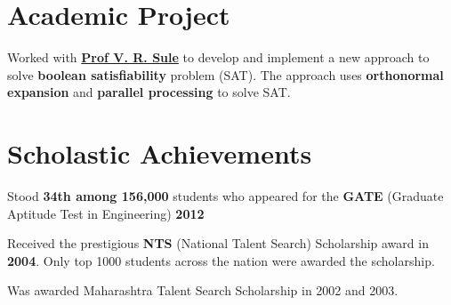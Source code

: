 \documentclass[12pt, a4paper]{deedy-resume}
\begin{document}
\begin{minipage}[t]{0.68\textwidth}
\sectionspace %

\section{Academic Project}
\vspace{\topsep}
Worked with \textbf{\href{https://www.ee.iitb.ac.in/web/faculty/homepage/vrs}{Prof V. R. Sule}} to develop and implement a new approach to solve \textbf{boolean satisfiability} problem (SAT). The approach uses \textbf{orthonormal expansion} and \textbf{parallel processing} to solve SAT.

\sectionspace %




\section{Scholastic Achievements} 
\vspace{\topsep}
\begin{tightitemize}
\item Stood \textbf{34th among 156,000} students who appeared for the \textbf{GATE} (Graduate Aptitude Test in Engineering) \textbf{2012}
\item Received the prestigious \textbf{NTS} (National Talent Search) Scholarship award in \textbf{2004}. Only top 1000 students across the nation were awarded the scholarship.
\item Was awarded Maharashtra Talent Search Scholarship in 2002 and 2003.
\end{tightitemize}

\sectionspace %

\end{minipage} %
\end{document}
